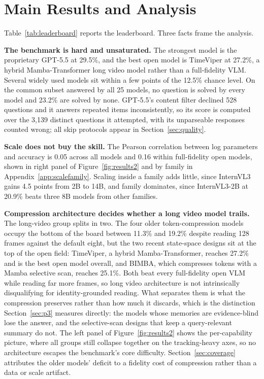\documentclass{article}
\newcommand{\nummodels}{25}
\newcommand{\chance}{12.5\%}
\begin{document}
\section{Main Results and Analysis}
\label{sec:results_analysis}
Table~\ref{tab:leaderboard} reports the leaderboard. Three facts frame the analysis.

\textbf{The benchmark is hard and unsaturated.} The strongest model is the proprietary GPT-5.5 at 29.5\%, and the best open model is TimeViper at 27.2\%, a hybrid Mamba-Transformer long video model rather than a full-fidelity VLM. Several widely used models sit within a few points of the \chance{} chance level. On the common subset answered by all \nummodels{} models, no question is solved by every model and 23.2\% are solved by none. GPT-5.5's content filter declined 528 questions and it answers repeated items inconsistently, so its score is computed over the 3{,}139 distinct questions it attempted, with its unparseable responses counted wrong; all skip protocols appear in Section~\ref{sec:quality}.

\textbf{Scale does not buy the skill.} The Pearson correlation between log parameters and accuracy is 0.05 across all models and 0.16 within full-fidelity open models, shown in right panel of Figure~\ref{fig:results2} and by family in Appendix~\ref{app:scalefamily}. Scaling inside a family adds little, since InternVL3 gains 4.5 points from 2B to 14B, and family dominates, since InternVL3-2B at 20.9\% beats three 8B models from other families.

\textbf{Compression architecture decides whether a long video model trails.} The long-video group splits in two. The four older token-compression models occupy the bottom of the board between 11.3\% and 19.2\% despite reading 128 frames against the default eight, but the two recent state-space designs sit at the top of the open field: TimeViper, a hybrid Mamba-Transformer, reaches 27.2\% and is the best open model overall, and BIMBA, which compresses tokens with a Mamba selective scan, reaches 25.1\%. Both beat every full-fidelity open VLM while reading far more frames, so long video architecture is not intrinsically disqualifying for identity-grounded reading. What separates them is what the compression preserves rather than how much it discards, which is the distinction Section~\ref{sec:p3} measures directly: the models whose memories are evidence-blind lose the answer, and the selective-scan designs that keep a query-relevant summary do not. The left panel of Figure~\ref{fig:results2} shows the per-capability picture, where all groups still collapse together on the tracking-heavy axes, so no architecture escapes the benchmark's core difficulty. Section~\ref{sec:coverage} attributes the older models' deficit to a fidelity cost of compression rather than a data or scale artifact.
\end{document}
